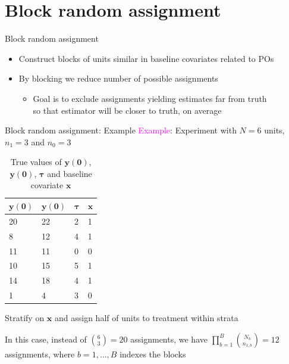 \documentclass[table, xcolor = {dvipsnames}, 9pt]{beamer}
\theoremstyle{plain}
\begin{document}
\section{Block random assignment}
\begin{frame}{Block random assignment}
\vfill
\begin{itemize} \vfill
\item Construct blocks of units similar in baseline covariates related to POs \vfill
\item By blocking we reduce number of possible assignments \vfill
\begin{itemize} \vfill
\item Goal is to exclude assignments yielding estimates far from truth \\ so that estimator will be closer to truth, on average \vfill
\end{itemize} \vfill
\end{itemize} \vfill
\end{frame}
\begin{frame}{Block random assignment: Example}
\vfill
\textcolor{magenta}{Example}: Experiment with $N = 6$ units, $n_1 = 3$ and $n_0= 3$
\begin{table}[H]
\centering
\begin{tabular}{l|l|l|l}
$\bm{y}(\bm{0})$ & $\bm{y}(\bm{0})$ & $\bm{\tau}$ & $\bm{x}$ \\ \hline
  20 & 22 & 2 & 1 \\
  8 & 12 & 4 & 1 \\
  11 & 11 & 0 & 0 \\
  10 & 15 & 5 & 1 \\
  14 & 18 & 4 & 1 \\
  1 &  4 & 3 & 0 \\
    \end{tabular}
\caption{True values of $\bm{y}(\bm{0})$, $\bm{y}(\bm{0})$, $\bm{\tau}$ and baseline covariate $\bm{x}$}
\end{table} \vfill
Stratify on $\bm{x}$ and assign half of units to treatment within strata \vfill

In this case, instead of $\binom{6}{3} = 20$ assignments, we have $\prod \limits_{b = 1}^B \binom{N_b}{n_{1,b}} = 12$ assignments, where $b = 1, \ldots , B$ indexes the blocks \vfill
\end{frame}
\end{document}
